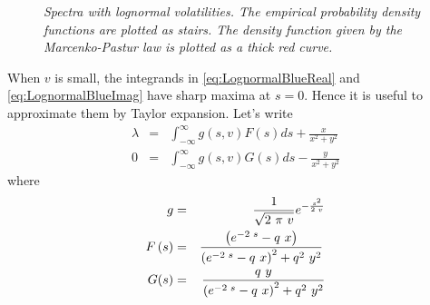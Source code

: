 \documentclass{article}
\begin{document}
\begin{figure}[htb!]
{    \label{fig:Lognormal_q0.5}
  }
  \caption{\small \it Spectra with lognormal volatilities. The
    empirical probability density functions are plotted as stairs. The
  density function given by the Marcenko-Pastur law is plotted as a
  thick red curve.}
  \label{fig:LognormalSpectra}
\end{figure}

When $v$ is small, the integrands in \eqref{eq:LognormalBlueReal} and
\eqref{eq:LognormalBlueImag} have sharp maxima at $s = 0$. Hence it is
useful to approximate them by Taylor expansion. Let's write
\begin{eqnarray*}
  \lambda &=& \int _{-\infty }^{\infty }\!g \left( s,v \right) F \left( s
  \right) {ds}+{\frac {x}{{x}^{2}+{y}^{2}}} \\
  0 &=& \int _{-\infty }^{\infty }\!g \left( s,v \right) G \left( s
  \right) {ds}-{\frac {y}{{x}^{2}+{y}^{2}}}
\end{eqnarray*}
where
\begin{eqnarray*}
g &=& \frac{1}{\sqrt{2\mathop{\rm  }\pi \mathop{\rm  }v }}e^{-\frac{s
    ^{2}}{2\mathop{\rm  }v }}\\
F \left(s \right) &=& \frac{\left(e^{-2\mathop{\rm  }s }-q \mathop{\rm
    }x \right)}{\left(e^{-2\mathop{\rm  }s }-q \mathop{\rm  }x
  \right)^{2}+q ^{2}\mathop{\rm  }y ^{2}}\mathop{\rm  } \\
G(s) &=& \frac{q \mathop{\rm  }y }{\left(e^{-2\mathop{\rm  }s }-q
    \mathop{\rm  }x \right)^{2}+q ^{2}\mathop{\rm  }y ^{2}}\\
\end{eqnarray*}
\end{document}
